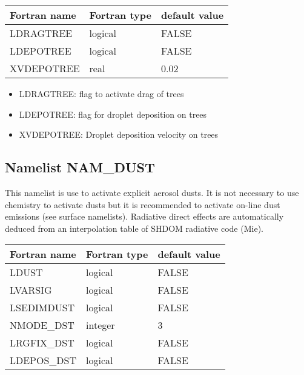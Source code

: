 \begin{center}
\begin{tabular} {|l|l|l|}
\hline
Fortran name & Fortran type & default value \\
\hline
LDRAGTREE   & logical  & FALSE  \\
LDEPOTREE   & logical  & FALSE  \\
XVDEPOTREE   & real  & 0.02  \\
\hline
\end{tabular}
\end{center}

\begin{itemize}

\item LDRAGTREE: flag to activate drag of trees
\item LDEPOTREE: flag for droplet deposition on trees
\item XVDEPOTREE: Droplet deposition velocity on trees
\end{itemize}
\subsection{Namelist NAM\_DUST }
This namelist is use to activate explicit aerosol dusts. 
It is not necessary to use chemistry to activate dusts but it is recommended to activate on-line dust emissions (see surface namelists).
Radiative direct effects are automatically deduced from an interpolation table of SHDOM radiative code (Mie). 

\begin{center}
\begin{tabular} {|l|l|l|}
\hline
Fortran name & Fortran type & default value \\
\hline
LDUST       & logical  & FALSE  \\
LVARSIG     & logical  & FALSE  \\
LSEDIMDUST  & logical  & FALSE  \\
NMODE\_DST & integer  &  3  \\
LRGFIX\_DST  & logical  & FALSE  \\
LDEPOS\_DST  & logical  & FALSE  \\
\hline
\end{tabular}
\end{center}

